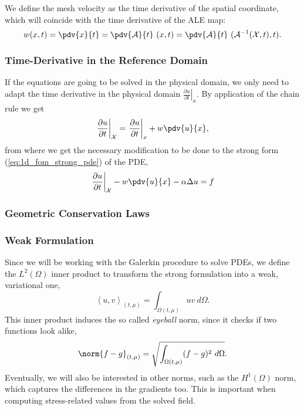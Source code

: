 \documentclass[../../main.tex]{subfiles}
\newcommand{\inner}[2]{\left<#1, #2\right>}
\newcommand{\alemap}{\ensuremath{\mathcal{A}}}
\newcommand{\aleX}{\ensuremath{\mathcal{X}}}
\begin{document}
We define the mesh velocity as the time derivative of the spatial coordinate, which will coincide with the time derivative of the ALE map:
\begin{equation}
    w(x,t) = \pdv{x}{t} = \pdv{\alemap}{t} \ (x, t) = \pdv{\alemap}{t} \ (\alemap^{-1} (\aleX,t), t).
\end{equation}

\subsubsection*{Time-Derivative in the Reference Domain}
If the equations are going to be solved in the physical domain, we only need to adapt the time derivative in the physical domain $\left.\frac{\partial u}{\partial t}\right|_{x}$.
By application of the chain rule we get
\begin{equation}
    \left.\frac{\partial u}{\partial t}\right|_{\aleX} = 
    \left.\frac{\partial u}{\partial t}\right|_{x} + w \pdv{u}{x},
\end{equation}
from where we get the necessary modification to be done to the strong form (\ref{eq:1d_fom_strong_pde}) of the PDE, 
\begin{equation}
    \left.\frac{\partial u}{\partial t}\right|_{\aleX} - w \pdv{u}{x} - \alpha \Delta u = f
\end{equation}

\subsubsection*{Geometric Conservation Laws}


\subsubsection{Weak Formulation}
Since we will be working with the Galerkin procedure to solve PDEs, 
we define the $L^2(\Omega)$ inner product to transform the strong formulation into a weak, variational one,
\begin{equation}
    \inner{u}{v}_{(t, \mu)} = \int_{\Omega(t, \mu)} uv\ d\Omega.
\end{equation}
This inner product induces the so called \emph{eyeball} norm, since it checks if two functions look alike,
\begin{equation}
    \norm{f-g}_{(t, \mu)}  = \sqrt{\int_{\Omega(t, \mu)} (f - g)^2\ d\Omega}.
\end{equation}
Eventually, we will also be interested in other norms, such as the $H^1(\Omega)$ norm, which captures the differences in the gradients too.
This is important when computing stress-related values from the solved field.
\end{document}
